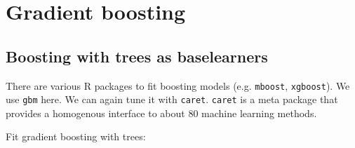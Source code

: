 \documentclass[11pt,a4paper,twoside]{article}\usepackage[]{graphicx}\usepackage[]{color}
\begin{document}
\clearpage 
\section{Gradient boosting}

\subsection{Boosting with trees as baselearners}

There are various R packages to fit boosting models (e.g. \texttt{mboost}, \texttt{xgboost}). We use \texttt{gbm} here. We can again tune it with \texttt{caret}. \texttt{caret} is a meta package that provides a homogenous interface to about 80 machine learning methods. 


Fit gradient boosting with trees: 
\end{document}
